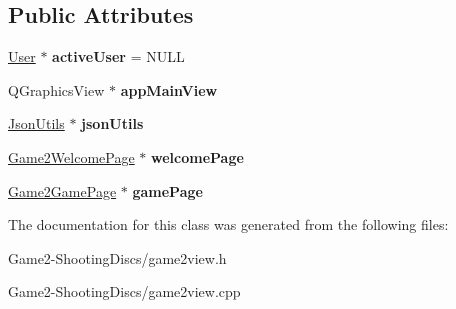 \subsection*{Public Attributes}
\begin{DoxyCompactItemize}
\item 
\mbox{\label{classGame2View_af6ff0b22ab9059944b9360619c20e4d9}} 
\hyperlink{classUser}{User} $\ast$ {\bfseries active\+User} = N\+U\+LL
\item 
\mbox{\label{classGame2View_ad2418450777f817b67ff2b419d22de37}} 
Q\+Graphics\+View $\ast$ {\bfseries app\+Main\+View}
\item 
\mbox{\label{classGame2View_a34cd40d8efdb712c11a728f8ea58846e}} 
\hyperlink{classJsonUtils}{Json\+Utils} $\ast$ {\bfseries json\+Utils}
\item 
\mbox{\label{classGame2View_a649d6baa095bd8c5137f048f6ff25fe3}} 
\hyperlink{classGame2WelcomePage}{Game2\+Welcome\+Page} $\ast$ {\bfseries welcome\+Page}
\item 
\mbox{\label{classGame2View_a464373379b7b9a087d7013c53c252ec9}} 
\hyperlink{classGame2GamePage}{Game2\+Game\+Page} $\ast$ {\bfseries game\+Page}
\end{DoxyCompactItemize}


The documentation for this class was generated from the following files\+:\begin{DoxyCompactItemize}
\item 
Game2-\/\+Shooting\+Discs/game2view.\+h\item 
Game2-\/\+Shooting\+Discs/game2view.\+cpp\end{DoxyCompactItemize}
